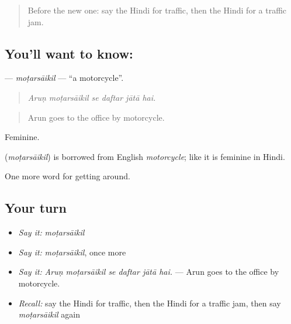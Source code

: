 \label{lesson:HI-C404-motarsaikil}



\begin{quote}
Before the new one: say the Hindi for traffic, then the Hindi for a traffic jam.
\end{quote}

\subsection*{You'll want to know: }
\textbf{} — \emph{moṭarsāikil} — \textquotedblleft{}a motorcycle\textquotedblright{}.

\begin{quote}
     
\end{quote}

\begin{quote}
\emph{Aruṇ moṭarsāikil se daftar jātā hai.}
\end{quote}

\begin{quote}
Arun goes to the office by motorcycle.
\end{quote}

Feminine.

\begin{cousinweb}
\textbf{} (\emph{moṭarsāikil}) is borrowed from English \emph{motorcycle}; like  it is feminine in Hindi.
\end{cousinweb}

\begin{grammarlens}[title={What you've built}]
One more word for getting around.
\end{grammarlens}

\subsection*{Your turn}
\begin{itemize}
\raggedright
  \item \emph{Say it:} \emph{moṭarsāikil}
  \item \emph{Say it:} \emph{moṭarsāikil}, once more
  \item \emph{Say it:} \emph{Aruṇ moṭarsāikil se daftar jātā hai.} — Arun goes to the office by motorcycle.
  \item \emph{Recall:} say the Hindi for traffic, then the Hindi for a traffic jam, then say \emph{moṭarsāikil} again
\end{itemize}

